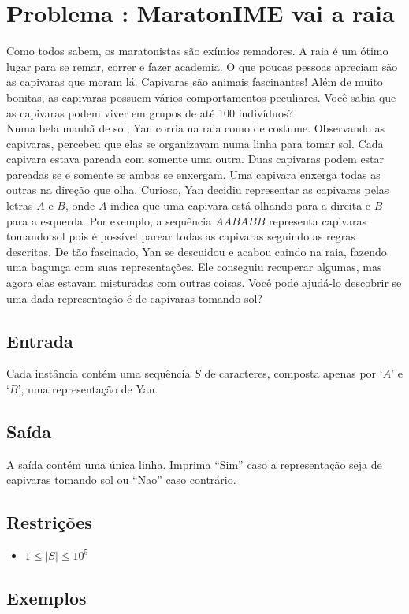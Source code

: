 \section*{Problema \proxLetra: MaratonIME vai a raia}

Como todos sabem, os maratonistas são exímios remadores. A raia é um ótimo lugar para se remar, correr e fazer academia. O que poucas pessoas apreciam são as capivaras que moram lá. Capivaras são animais fascinantes! Além de muito bonitas, as capivaras possuem vários comportamentos peculiares. Você sabia que as capivaras podem viver em grupos de até 100 indivíduos?\\
Numa bela manhã de sol, Yan corria na raia como de costume. Observando as capivaras, percebeu que elas se organizavam numa linha para tomar sol. Cada capivara estava pareada com somente uma outra. Duas capivaras podem estar pareadas se e somente se ambas se enxergam. Uma capivara enxerga todas as outras na direção que olha. 
Curioso, Yan decidiu representar as capivaras pelas letras $A$ e $B$, onde $A$ indica que uma capivara está olhando para a direita e $B$ para a esquerda.
Por exemplo, a sequência $AABABB$ representa capivaras tomando sol pois é possível parear todas as capivaras seguindo as regras descritas. De tão fascinado, Yan se descuidou e acabou caindo na raia, fazendo uma bagunça com suas representações. Ele conseguiu recuperar algumas, mas agora elas estavam misturadas com outras coisas. Você pode ajudá-lo descobrir se uma dada representação é de capivaras tomando sol?

\subsection*{Entrada}

Cada instância contém uma sequência $S$ de caracteres, composta apenas por `$A$' e `$B$', uma representação de Yan.

\subsection*{Saída}

A saída contém uma única linha. Imprima ``Sim'' caso a representação seja de capivaras tomando sol ou ``Nao'' caso contrário.


\subsection*{Restrições}
\begin{itemize}
  \item $1 \leq |S| \leq 10^5$
\end{itemize}

\subsection*{Exemplos}

\begin{center}
\end{center}
